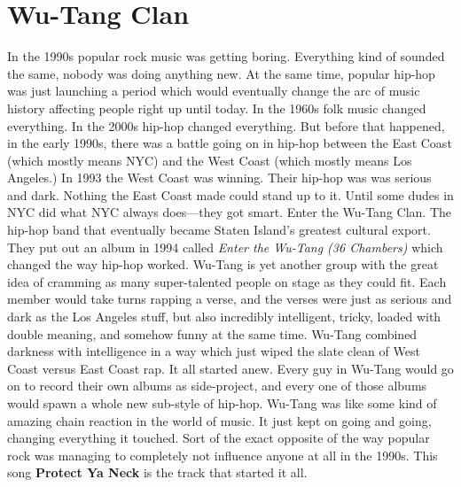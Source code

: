 \documentclass[letterpaper,single]{article}
\begin{document}
\section{Wu-Tang Clan}
In the 1990s popular rock music was getting boring. 
Everything kind of sounded the same, nobody was doing anything new.
At the same time, popular hip-hop was just launching a period which would eventually change the arc of music history affecting people right up until today.
In the 1960s folk music changed everything. In the 2000s hip-hop changed everything.
But before that happened, in the early 1990s, there was a battle going on in hip-hop between the East Coast (which mostly means NYC) and the West Coast (which mostly means Los Angeles.)
In 1993 the West Coast was winning. 
Their hip-hop was was serious and dark.
Nothing the East Coast made could stand up to it.
Until some dudes in NYC did what NYC always does---they got smart.
Enter the Wu-Tang Clan. The hip-hop band that eventually became Staten Island's greatest cultural export.
They put out an album in 1994 called \emph{Enter the Wu-Tang (36 Chambers)} which changed the way hip-hop worked.
Wu-Tang is yet another group with the great idea of cramming as many super-talented people on stage as they could fit.
Each member would take turns rapping a verse, and the verses were just as serious and dark as the Los Angeles stuff, but also incredibly intelligent, tricky, loaded with double meaning, and somehow funny at the same time.
Wu-Tang combined darkness with intelligence in a way which just wiped the slate clean of West Coast versus East Coast rap. It all started anew.
Every guy in Wu-Tang would go on to record their own albums as side-project, and every one of those albums would spawn a whole new sub-style of hip-hop.
Wu-Tang was like some kind of amazing chain reaction in the world of music. It just kept on going and going, changing everything it touched.
Sort of the exact opposite of the way popular rock was managing to completely not influence anyone at all in the 1990s.
This song \textbf{Protect Ya Neck} is the track that started it all.
\end{document}
